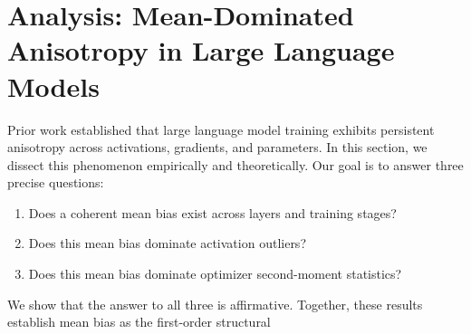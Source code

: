 \section{Analysis: Mean-Dominated Anisotropy in Large Language Models}

Prior work established that large language model training
exhibits persistent anisotropy across activations, gradients, and parameters.
In this section, we dissect this phenomenon empirically and theoretically.
Our goal is to answer three precise questions:

\begin{enumerate}[leftmargin=*,itemsep=2pt]
    \item Does a coherent mean bias exist across layers and training stages?
    \item Does this mean bias dominate activation outliers?
    \item Does this mean bias dominate optimizer second-moment statistics?
\end{enumerate}

We show that the answer to all three is affirmative.
Together, these results establish mean bias as the first-order structural




